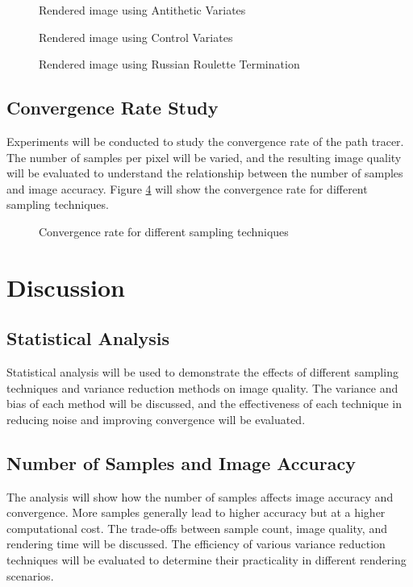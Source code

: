 \documentclass[12pt]{article}
\begin{document}
\begin{figure}[h]
    \centering
    \caption{Rendered image using Antithetic Variates}
    \label{fig:antithetic_variates}
\end{figure}

\begin{figure}[h]
    \centering
    \caption{Rendered image using Control Variates}
    \label{fig:control_variates}
\end{figure}

\begin{figure}[h]
    \centering
    \caption{Rendered image using Russian Roulette Termination}
    \label{fig:russian_roulette}
\end{figure}

\subsection{Convergence Rate Study}
Experiments will be conducted to study the convergence rate of the path tracer. The number of samples per pixel will be varied, and the resulting image quality will be evaluated to understand the relationship between the number of samples and image accuracy. Figure \ref{fig:convergence_rate} will show the convergence rate for different sampling techniques.

\begin{figure}[h]
    \centering
    \caption{Convergence rate for different sampling techniques}
    \label{fig:convergence_rate}
\end{figure}

\section{Discussion}
\label{sec:discussion}
\subsection{Statistical Analysis}
Statistical analysis will be used to demonstrate the effects of different sampling techniques and variance reduction methods on image quality. The variance and bias of each method will be discussed, and the effectiveness of each technique in reducing noise and improving convergence will be evaluated.

\subsection{Number of Samples and Image Accuracy}
The analysis will show how the number of samples affects image accuracy and convergence. More samples generally lead to higher accuracy but at a higher computational cost. The trade-offs between sample count, image quality, and rendering time will be discussed. The efficiency of various variance reduction techniques will be evaluated to determine their practicality in different rendering scenarios.
\end{document}
